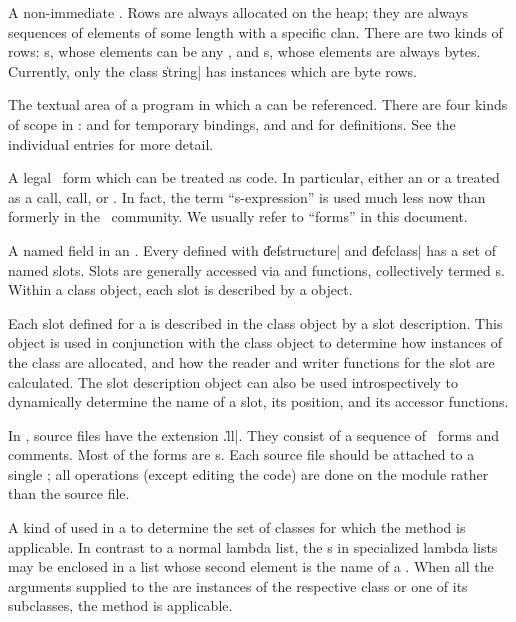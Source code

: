\begin{description}
	{A non-immediate .  Rows are always allocated on
	the heap; they are always sequences of elements of some length
	with a specific clan.  There are two kinds of rows:
	s, whose elements can be any ,
	and s, whose elements are always bytes.
	Currently, only the class \|string| has instances which are
	byte rows.}

	{The textual area of a program in which a  can
	be referenced.  There are four kinds of scope in \Talk:
	 and  for temporary
	bindings, and  and  for
	definitions.   See the individual entries for more detail.}

	{A legal \Talk\ form which can be treated as code.  In
	particular, either an  or a 
	treated as a  call,  call, or
	.  In fact, the term ``s-expression'' is
	used much less now than formerly in the \Lisp\ community.  We
	usually refer to ``forms'' in this document.}

	{A named field in an .  Every 
	defined with \|defstructure| and \|defclass| has a set of
	named slots.  Slots are generally accessed via 
	and  functions, collectively termed
	s.  Within a class object, each slot is
	described by a  object.}

	{Each slot defined for a  is described in the
	class object by a slot description.  This object is used in
	conjunction with the class object to determine how instances
	of the class are allocated, and how the reader and writer
	functions for the slot are calculated.  The slot description
	object can also be used introspectively to dynamically
	determine the name of a slot, its position, and its accessor
	functions.}

	{In \Talk, source files have the extension \|.ll|.  They
	consist of a sequence of \Talk\ forms and comments.  Most of
	the forms are s.  Each source file should be
	attached to a single ; all operations (except
	editing the code) are done on the module rather than the
	source file.}

	{A kind of  used in a  to
	determine the set of classes for which the method is
	applicable.  In contrast to a normal lambda list, the
	s in specialized lambda lists may be
	enclosed in a list whose second element is the name of a
	.  When all the arguments supplied to the
	 are instances of the respective class
	or one of its subclasses, the method is applicable.}


\end{description}
